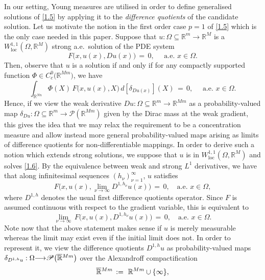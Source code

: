 \documentclass{amsart}
\theoremstyle{definition}
\numberwithin{equation}{section}
\begin{document}
In our setting, Young measures are utilised in order to define generalised solutions of \eqref{1.5} by applying it to the \emph{difference quotients} of the candidate solution. Let us motivate the notion in the first order case $p=1$ of \eqref{1.5} which is the only case needed in this paper. Suppose that $u : {\Omega} {\subseteq} {\mathbb{R}}^m {\longrightarrow} {\mathbb{R}}^M$ is a $W^{1,1}_{\text{loc}}({\Omega},{\mathbb{R}}^M)$ strong a.e.\ solution of the PDE system
\begin{equation}   \label{1.6}
F\big(x,u(x),Du(x) \big)\,=\, 0, \quad \text{ a.e.\ }x\in {\Omega}.
\end{equation}
Then, observe that $u$ is a solution if and only if for any compactly supported function $\Phi \in C^0_c\big( {\mathbb{R}}^{Mm} \big)$, we have
\[
\int_{{\mathbb{R}}^{Nn}} \Phi(X)\, F\big( x,u(x),X\big)\, d[{\delta}_{Du(x)} ](X)\, =\, 0, \quad \text{ a.e. }x\in {\Omega}.
\] 
Hence, if we view the weak derivative $Du : {\Omega}{\subseteq} {\mathbb{R}}^m {\longrightarrow}{\mathbb{R}}^{Mm}$ as a probability-valued map ${\delta}_{Du} : {\Omega}{\subseteq} {\mathbb{R}}^m {\longrightarrow} {\mathscr{P}}({\mathbb{R}}^{Mm})$ given by the Dirac mass at the weak gradient, this gives the idea that we may relax the requirement to be a concentration measure and allow instead more general probability-valued maps arising as limits of difference quotients for non-differentiable mappings. In order to derive such a notion which extends strong solutions, we suppose that $u$ is in $W^{1,1}_{\text{loc}}({\Omega},{\mathbb{R}}^M)$ and solves \eqref{1.6}. By the equivalence between weak and strong $L^1$ derivatives, we have that along infinitesimal sequences $(h_\nu)_{\nu=1}^\infty$, $u$ satisfies
\[
F\Big(x,u(x),\lim_{\nu{\rightarrow} \infty}D^{1,h_\nu}u(x)\Big)\, =\, 0, \ \ \ \text{ a.e. }x\in {\Omega},
\]
where $D^{1,h}$ denotes the usual first difference quotients operator. Since $F$ is assumed continuous with respect to the gradient variable, this is equivalent to
\[
\lim_{\nu{\rightarrow} \infty}\, F\Big(x,u(x),D^{1,h_\nu}u(x)\Big)\, =\, 0, \ \ \ \text{ a.e. }x\in {\Omega}.
\]
Note now that the above statement makes sense if $u$ is merely measurable whereas the limit may exist even if the initial limit does not. In order to represent it, we view the difference quotients $D^{1,h}u$ as probability-valued maps ${\delta}_{D^{1,h}u}: {\Omega} {\longrightarrow} \mathscr{P}\big( \smash{\overline{\mathbb{R}}}^{Mm} \big)$ over the Alexandroff compactification
\[
\smash{\overline{\mathbb{R}}}^{Mm}\, :=\ {\mathbb{R}}^{Mm}\cup \{\infty\},
\]
\end{document}
